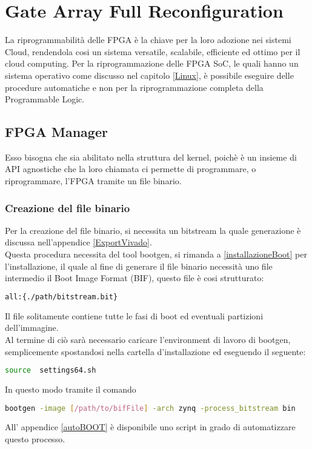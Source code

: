 \chapter{Gate Array Full Reconfiguration}
\label{chap:Cap3}
La riprogrammabilità delle FPGA è la chiave per la loro adozione nei sistemi Cloud, rendendola cosi un sistema versatile, scalabile, efficiente ed ottimo per il cloud computing. Per la riprogrammazione delle FPGA SoC, le quali hanno un sistema operativo come discusso nel capitolo \ref{Linux}, è possibile eseguire delle procedure automatiche e non per la riprogrammazione completa della Programmable Logic.
\section{FPGA Manager}
Esso bisogna che sia abilitato nella struttura del kernel, poichè è un insieme di API agnostiche che la loro chiamata ci permette di programmare, o riprogrammare, l'FPGA tramite un file binario.
\subsection{Creazione del file binario}
Per la creazione del file binario, si necessita un bitstream la quale generazione è discussa nell'appendice \ref{ExportVivado}.\\
Questa procedura necessita del tool bootgen, si rimanda a \ref{installazioneBoot} per l'installazione, il quale al fine di generare il file binario necessità uno file intermedio il Boot Image Format (BIF), questo file è cosi strutturato:
\begin{lstlisting}[language=sh, label=lst:C, caption={template file .bif}]
all:{./path/bitstream.bit}
\end{lstlisting}
Il file solitamente contiene tutte le fasi di boot ed eventuali partizioni dell'immagine.\\
Al termine di ciò sarà necessario caricare l'environment di lavoro di bootgen, semplicemente spostandosi nella cartella d'installazione ed eseguendo il seguente:
\begin{lstlisting}[language=sh, label=lst:C, caption={setup environment bootgen}]
source  settings64.sh
\end{lstlisting}
In questo modo tramite il comando 
\begin{lstlisting}[language=sh, label=lst:C, caption={setup environment bootgen}]
bootgen -image [/path/to/bifFile] -arch zynq -process_bitstream bin
\end{lstlisting}
All' appendice \ref{autoBOOT} è disponibile uno script in grado di automatizzare questo processo.
